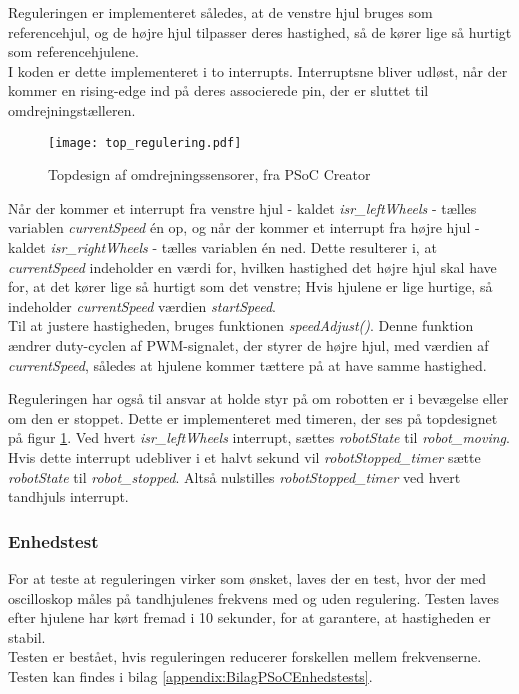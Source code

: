 Reguleringen er implementeret således, at de venstre hjul bruges som referencehjul, og de højre hjul tilpasser deres hastighed, så de kører lige så hurtigt som referencehjulene. \\
I koden er dette implementeret i to interrupts. 
Interruptsne bliver udløst, når der kommer en rising-edge ind på deres associerede pin, der er sluttet til omdrejningstælleren. 
\begin{figure}[H] %
\centering
\texttt{[image: top\_regulering.pdf]}
\caption{Topdesign af omdrejningssensorer, fra PSoC Creator}
\label{fig:top_regulering}
\end{figure}
Når der kommer et interrupt fra venstre hjul - kaldet \textit{isr\_leftWheels} -  tælles variablen \textit{currentSpeed} én op, og når der kommer et interrupt fra højre hjul - kaldet \textit{isr\_rightWheels} - tælles variablen én ned.
Dette resulterer i, at \textit{currentSpeed} indeholder en værdi for, hvilken hastighed det højre hjul skal have for, at det kører lige så hurtigt som det venstre; Hvis hjulene er lige hurtige, så indeholder \textit{currentSpeed} værdien \textit{startSpeed}. \\
Til at justere hastigheden, bruges funktionen \textit{speedAdjust()}. 
Denne funktion ændrer duty-cyclen af PWM-signalet, der styrer de højre hjul, med værdien af \textit{currentSpeed}, således at hjulene kommer tættere på at have samme hastighed.

Reguleringen har også til ansvar at holde styr på om robotten er i bevægelse eller om den er stoppet. Dette er implementeret med timeren, der ses på topdesignet på figur \ref{fig:top_regulering}.
Ved hvert \textit{isr\_leftWheels} interrupt, sættes \textit{robotState} til \textit{robot\_moving}. 
Hvis dette interrupt udebliver i et halvt sekund vil \textit{robotStopped\_timer} sætte \textit{robotState} til \textit{robot\_stopped}. 
Altså nulstilles \textit{robotStopped\_timer} ved hvert tandhjuls interrupt.


\subsubsection{Enhedstest}
For at teste at reguleringen virker som ønsket, laves der en test, hvor der med oscilloskop måles på tandhjulenes frekvens med og uden regulering. Testen laves efter hjulene har kørt fremad i 10 sekunder, for at garantere, at hastigheden er stabil. \\
Testen er bestået, hvis reguleringen reducerer forskellen mellem frekvenserne. \\
Testen kan findes i bilag \ref{appendix:BilagPSoCEnhedstests}.

